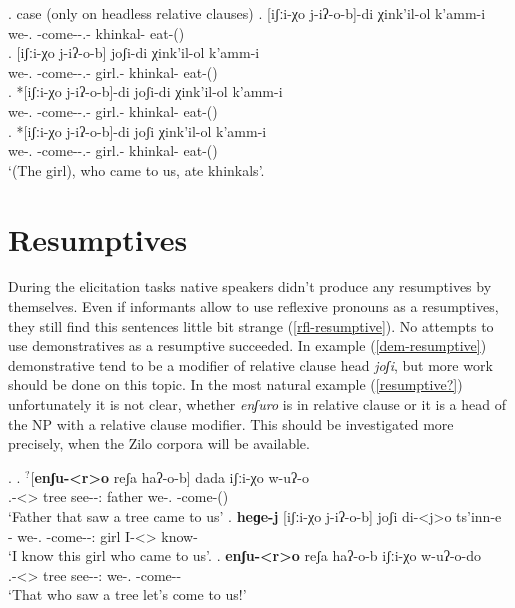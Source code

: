 \ex. case (only on headless relative clauses)
	\ag. [iʃːi-χo j-iʔ-o-b]-di χink'il-ol k'amm-i\\
			{we-\Add.\Lat} {\M-come-\Pst-\Ptcp.\Pst-\Erg} {khinkal-\Pl} {eat-\Pst(\Aor)}\\
	\bg. [iʃːi-χo j-iʔ-o-b] joʃi-di χink'il-ol k'amm-i\\
			{we-\Add.\Lat} {\M-come-\Pst-\Ptcp.\Pst-\Erg} {girl.\Obl-\Erg} {khinkal-\Pl} {eat-\Pst(\Aor)}\\
	\bg. *[iʃːi-χo j-iʔ-o-b]-di joʃi-di χink'il-ol k'amm-i\\
			{we-\Add.\Lat} {\M-come-\Pst-\Ptcp.\Pst-\Erg} {girl.\Obl-\Erg} {khinkal-\Pl} {eat-\Pst(\Aor)}\\
	\bg. *[iʃːi-χo j-iʔ-o-b]-di joʃi χink'il-ol k'amm-i\\
			{we-\Add.\Lat} {\M-come-\Pst-\Ptcp.\Pst-\Erg} {girl.\Obl-\Erg} {khinkal-\Pl} {eat-\Pst(\Aor)}\\
			\glt `(The girl), who came to us, ate khinkals'.

\pagebreak

\section{Resumptives}
During the elicitation tasks native speakers didn't produce any resumptives by themselves. Even if informants allow to use reflexive pronouns as a resumptives, they still find this sentences little bit strange (\ref{rfl-resumptive}). No attempts to use demonstratives as a resumptive succeeded. In example (\ref{dem-resumptive}) demonstrative tend to be a modifier of relative clause head \textit{joʃi}, but more work should be done on this topic. In the most natural example (\ref{resumptive?}) unfortunately it is not clear, whether \textit{enʃuro} is in relative clause or it is a head of the NP with a relative clause modifier. This should be investigated more precisely, when the Zilo corpora will be available.

\ex.  
	\ag. $^?$[\textbf{enʃu-<r>o} reʃa haʔ-o-b] dada iʃːi-χo w-uʔ-o\\
		{\Rfl.\Obl-<\Nans>\Aff} tree {see-\Pst-\Ptcp:\Pst} father {we-\Add.\Lat} {\M-come-\Pst(\Aor)}\\
		\glt `Father that saw a tree came to us' \label{rfl-resumptive}
	\bg. \textbf{heɡe-j} [iʃːi-χo j-iʔ-o-b] joʃi di-<j>o ts'inn-e\\
		{\Dem-\F} {we-\Add.\Lat} {\M-come-\Pst-\Ptcp:\Pst} girl {I-<\F>\Aff} {know-\Hab}\\
		\glt `I know this girl who came to us'. \label{dem-resumptive}
	\bg. \textbf{enʃu-<r>o} reʃa haʔ-o-b iʃːi-χo w-uʔ-o-do\\
		{\Rfl.\Obl-<\Nans>\Aff} tree {see-\Pst-\Ptcp:\Pst} {we-\Add.\Lat} {\M-come-\Imp-\Jus}\\
		\glt `That who saw a tree let's come to us!' \label{resumptive?}
 
